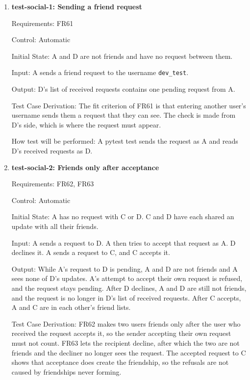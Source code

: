 \documentclass[12pt, titlepage]{article}
\begin{document}
\begin{enumerate}

\item{\textbf{test-social-1: Sending a friend request}\\}

Requirements: FR61

Control: Automatic

Initial State: A and D are not friends and have no request between them.

Input: A sends a friend request to the username \texttt{dev\_test}.

Output: D's list of received requests contains one pending request from A.

Test Case Derivation: The fit criterion of FR61 is that entering another
user's username sends them a request that they can see. The check is made
from D's side, which is where the request must appear.

How test will be performed: A pytest test sends the request as A and reads
D's received requests as D.

\item{\textbf{test-social-2: Friends only after acceptance}\\}

Requirements: FR62, FR63

Control: Automatic

Initial State: A has no request with C or D. C and D have each shared an
update with all their friends.

Input: A sends a request to D. A then tries to accept that request as A. D
declines it. A sends a request to C, and C accepts it.

Output: While A's request to D is pending, A and D are not friends and A sees
none of D's updates. A's attempt to accept their own request is refused, and
the request stays pending. After D declines, A and D are still not friends,
and the request is no longer in D's list of received requests. After C
accepts, A and C are in each other's friend lists.

Test Case Derivation: FR62 makes two users friends only after the user who
received the request accepts it, so the sender accepting their own request
must not count. FR63 lets the recipient decline, after which the two are not
friends and the decliner no longer sees the request. The accepted request to
C shows that acceptance does create the friendship, so the refusals are not
caused by friendships never forming.


\end{enumerate}
\end{document}
